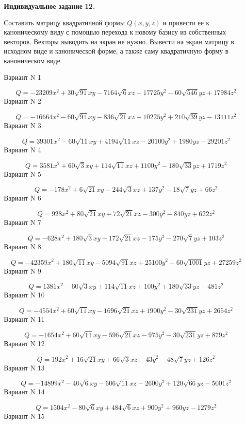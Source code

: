 \documentclass[11pt]{report}
\begin{document}
\pagestyle{empty}

{\bf Индивидуальное задание 12.}


Составить матрицу квадратичной формы $Q(x, y, z)$ и привести ее к каноническому виду 
с помощью перехода к новому базису из собственных векторов. 
Векторы выводить на экран не нужно. 
Вывести на экран матрицу в исходном виде и канонической форме, 
а также саму квадратичную форму в каноническом виде.

Вариант N 1

$$Q = - 23209 x^{2} + 30 \sqrt{91} x y - 7164 \sqrt{6} x z + 17725 y^{2} - 60 \sqrt{546} y z + 17984 z^{2}$$Вариант N 2

$$Q = - 16664 x^{2} - 60 \sqrt{91} x y - 836 \sqrt{21} x z - 10225 y^{2} + 210 \sqrt{39} y z - 13111 z^{2}$$Вариант N 3

$$Q = 39301 x^{2} - 60 \sqrt{11} x y + 4194 \sqrt{11} x z - 20100 y^{2} + 1980 y z - 29201 z^{2}$$Вариант N 4

$$Q = 3581 x^{2} + 60 \sqrt{3} x y + 114 \sqrt{11} x z + 1100 y^{2} - 180 \sqrt{33} y z + 1719 z^{2}$$Вариант N 5

$$Q = - 178 x^{2} + 6 \sqrt{21} x y - 244 \sqrt{3} x z + 137 y^{2} - 18 \sqrt{7} y z + 66 z^{2}$$Вариант N 6

$$Q = 928 x^{2} + 80 \sqrt{21} x y + 72 \sqrt{21} x z - 300 y^{2} - 840 y z + 622 z^{2}$$Вариант N 7

$$Q = - 628 x^{2} + 180 \sqrt{3} x y - 172 \sqrt{21} x z - 175 y^{2} - 270 \sqrt{7} y z + 103 z^{2}$$Вариант N 8

$$Q = - 42359 x^{2} + 180 \sqrt{11} x y - 5094 \sqrt{91} x z + 25100 y^{2} - 60 \sqrt{1001} y z + 27259 z^{2}$$Вариант N 9

$$Q = 1381 x^{2} - 60 \sqrt{3} x y + 114 \sqrt{11} x z + 100 y^{2} + 180 \sqrt{33} y z - 481 z^{2}$$Вариант N 10

$$Q = - 4554 x^{2} + 60 \sqrt{11} x y - 1696 \sqrt{21} x z + 1900 y^{2} - 30 \sqrt{231} y z + 2654 z^{2}$$Вариант N 11

$$Q = - 1654 x^{2} + 60 \sqrt{11} x y - 596 \sqrt{21} x z - 975 y^{2} - 30 \sqrt{231} y z + 879 z^{2}$$Вариант N 12

$$Q = 192 x^{2} + 16 \sqrt{21} x y + 66 \sqrt{3} x z - 43 y^{2} - 48 \sqrt{7} y z + 126 z^{2}$$Вариант N 13

$$Q = - 14899 x^{2} - 40 \sqrt{6} x y - 606 \sqrt{11} x z - 2600 y^{2} + 120 \sqrt{66} y z - 5001 z^{2}$$Вариант N 14

$$Q = 1504 x^{2} - 80 \sqrt{6} x y + 484 \sqrt{6} x z + 900 y^{2} + 960 y z - 1279 z^{2}$$Вариант N 15
\end{document}
